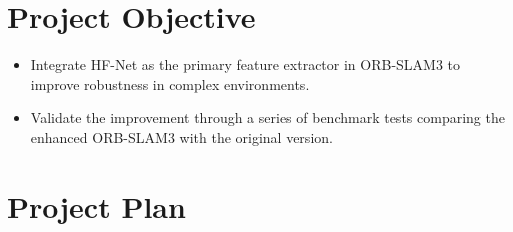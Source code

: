 \documentclass[a4paper,12pt]{article}
\begin{document}
\section*{Project Objective}
\begin{spacing}{1}
    \begin{itemize}
        \item Integrate HF-Net as the primary feature extractor in ORB-SLAM3 to improve robustness in complex environments.
        \item Validate the improvement through a series of benchmark tests comparing the enhanced ORB-SLAM3 with the original version.
    \end{itemize}
\end{spacing}

\section*{Project Plan}
\end{document}
